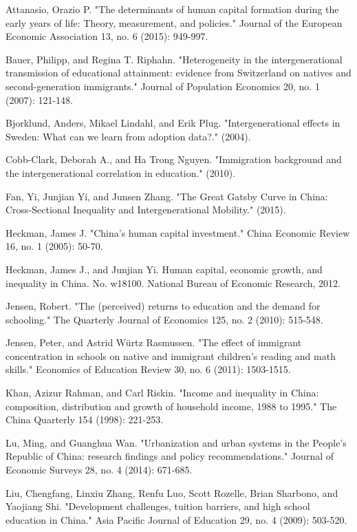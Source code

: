 \documentclass[12pt]{article}%
\theoremstyle{definition}
\numberwithin{equation}{section}
\begin{document}
\newpage
\begin{thebibliography}{1}
Attanasio, Orazio P. "The determinants of human capital formation during the early years of life: Theory, measurement, and policies." Journal of the European Economic Association 13, no. 6 (2015): 949-997.

Bauer, Philipp, and Regina T. Riphahn. "Heterogeneity in the intergenerational transmission of educational attainment: evidence from Switzerland on natives and second-generation immigrants." Journal of Population Economics 20, no. 1 (2007): 121-148.

Bjorklund, Anders, Mikael Lindahl, and Erik Plug. "Intergenerational effects in Sweden: What can we learn from adoption data?." (2004).

Cobb-Clark, Deborah A., and Ha Trong Nguyen. "Immigration background and the intergenerational correlation in education." (2010).

Fan, Yi, Junjian Yi, and Junsen Zhang. "The Great Gatsby Curve in China: Cross-Sectional Inequality and Intergenerational Mobility." (2015).

Heckman, James J. "China's human capital investment." China Economic Review 16, no. 1 (2005): 50-70.

Heckman, James J., and Junjian Yi. Human capital, economic growth, and inequality in China. No. w18100. National Bureau of Economic Research, 2012.

Jensen, Robert. "The (perceived) returns to education and the demand for schooling." The Quarterly Journal of Economics 125, no. 2 (2010): 515-548.

Jensen, Peter, and Astrid Würtz Rasmussen. "The effect of immigrant concentration in schools on native and immigrant children's reading and math skills." Economics of Education Review 30, no. 6 (2011): 1503-1515.

Khan, Azizur Rahman, and Carl Riskin. "Income and inequality in China: composition, distribution and growth of household income, 1988 to 1995." The China Quarterly 154 (1998): 221-253.

Lu, Ming, and Guanghua Wan. "Urbanization and urban systems in the People's Republic of China: research findings and policy recommendations." Journal of Economic Surveys 28, no. 4 (2014): 671-685.

Liu, Chengfang, Linxiu Zhang, Renfu Luo, Scott Rozelle, Brian Sharbono, and Yaojiang Shi. "Development challenges, tuition barriers, and high school education in China." Asia Pacific Journal of Education 29, no. 4 (2009): 503-520.


\end{thebibliography}
\end{document}
